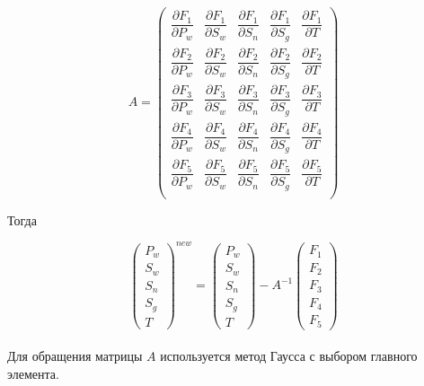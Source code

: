 \begin{equation}
A=
\begin{pmatrix}
\dfrac{\partial{F_1}}{\partial{P_w}} & \dfrac{\partial{F_1}}{\partial{S_w}} & \dfrac{\partial{F_1}}{\partial{S_n}} & \dfrac{\partial{F_1}}{\partial{S_g}} & \dfrac{\partial{F_1}}{\partial{T}}\\[3mm]
\dfrac{\partial{F_2}}{\partial{P_w}} & \dfrac{\partial{F_2}}{\partial{S_w}} & \dfrac{\partial{F_2}}{\partial{S_n}} & \dfrac{\partial{F_2}}{\partial{S_g}} & \dfrac{\partial{F_2}}{\partial{T}}\\[3mm]
\dfrac{\partial{F_3}}{\partial{P_w}} & \dfrac{\partial{F_3}}{\partial{S_w}} & \dfrac{\partial{F_3}}{\partial{S_n}} & \dfrac{\partial{F_3}}{\partial{S_g}} & \dfrac{\partial{F_3}}{\partial{T}}\\[3mm]
\dfrac{\partial{F_4}}{\partial{P_w}} & \dfrac{\partial{F_4}}{\partial{S_w}} & \dfrac{\partial{F_4}}{\partial{S_n}} & \dfrac{\partial{F_4}}{\partial{S_g}} & \dfrac{\partial{F_4}}{\partial{T}}\\[3mm]
\dfrac{\partial{F_5}}{\partial{P_w}} & \dfrac{\partial{F_5}}{\partial{S_w}} & \dfrac{\partial{F_5}}{\partial{S_n}} & \dfrac{\partial{F_5}}{\partial{S_g}} & \dfrac{\partial{F_5}}{\partial{T}}\\[3mm]
\end{pmatrix}
\end{equation}

Тогда

\begin{equation}
\begin{pmatrix}
P_w\\
S_w\\
S_n\\
S_g\\
T
\end{pmatrix}^{new}
=
\begin{pmatrix}
P_w\\
S_w\\
S_n\\
S_g\\
T
\end{pmatrix}
-A^{-1}
\begin{pmatrix}
F_1\\
F_2\\
F_3\\
F_4\\
F_5
\end{pmatrix}
\end{equation}\\

Для обращения матрицы $A$ используется метод Гаусса с выбором
главного элемента\cite{Kalitkin}.
